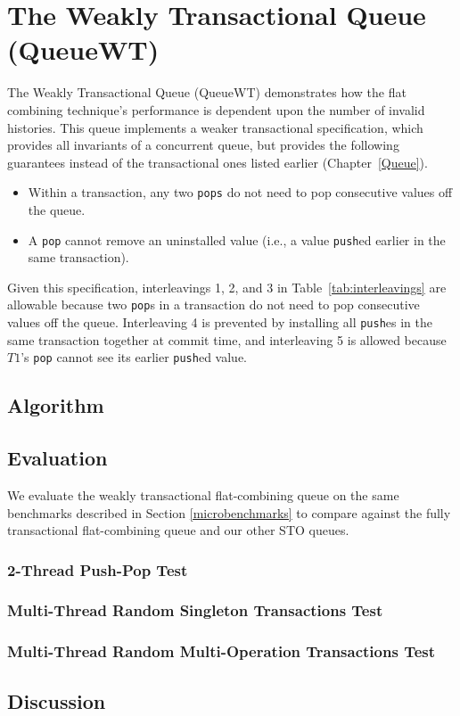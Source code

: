 \section{The Weakly Transactional Queue (QueueWT)}

The Weakly Transactional Queue (QueueWT) demonstrates how the flat combining technique's performance is dependent upon the number of invalid histories. This queue implements a weaker transactional specification, which provides all invariants of a concurrent queue, but provides the following guarantees instead of the transactional ones listed earlier (Chapter~\ref{Queue}).
\begin{itemize}
    \item Within a transaction, any two \texttt{pops} do not need to pop consecutive values off the queue.
    \item A \texttt{pop} cannot remove an uninstalled value (i.e., a value \texttt{push}ed earlier in the same transaction).
\end{itemize}

Given this specification, interleavings 1, 2, and 3 in Table~\ref{tab:interleavings} are allowable because two \texttt{pop}s in a transaction do not need to pop consecutive values off the queue. Interleaving 4 is prevented by installing all \texttt{push}es in the same transaction together at commit time, and interleaving 5 is allowed because $T1$'s \texttt{pop} cannot see its earlier \texttt{push}ed value.

\subsection{Algorithm}

\subsection{Evaluation}
%

We evaluate the weakly transactional flat-combining queue on the same benchmarks described in Section \ref{microbenchmarks} to compare against the fully transactional flat-combining queue and our other STO queues.

\subsubsection{2-Thread Push-Pop Test}

\subsubsection{Multi-Thread Random Singleton Transactions Test}

\subsubsection{Multi-Thread Random Multi-Operation Transactions Test}

\subsection{Discussion}
